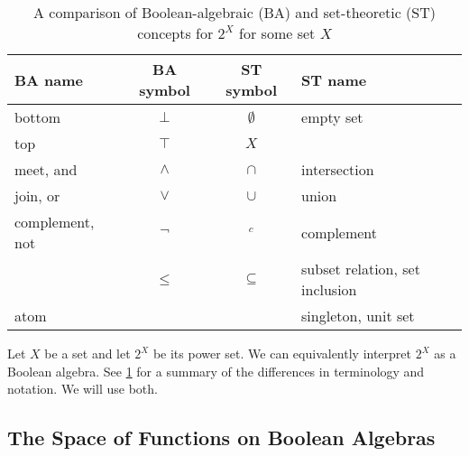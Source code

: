 \documentclass{article}
\theoremstyle{definition}
\theoremstyle{remark}
\begin{document}
\begin{table}
  \centering
  \caption{A comparison of Boolean-algebraic (BA) and set-theoretic (ST)
    concepts for $2^X$ for some set $X$}
  \label{tbl:notation}
  \begin{tabular}{lccl}
    \toprule
    BA name & BA symbol & ST symbol & ST name \\
    \midrule
    bottom & $\bot$ & $\emptyset$ & empty set \\
    top & $\top$ & $X$ & \\
    meet, and & $\land$ & $\cap$ & intersection \\
    join, or & $\lor$ & $\cup$ & union \\
    complement, not & $\neg$ & $^c$ & complement \\
            & $\le$ & $\subseteq$ & subset relation, set inclusion \\
    atom & & & singleton, unit set \\
    \bottomrule
  \end{tabular}
\end{table}

Let $X$ be a set and let $2^X$ be its power set. We can equivalently interpret
$2^X$ as a Boolean algebra. See \cref{tbl:notation} for a summary of the
differences in terminology and notation. We will use both.

\subsection{The Space of Functions on Boolean Algebras}
\end{document}
